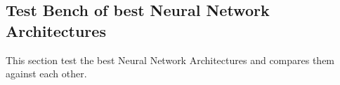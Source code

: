 \subsection{Test Bench of best Neural Network Architectures}
This section test the best Neural Network Architectures and compares them against each other.